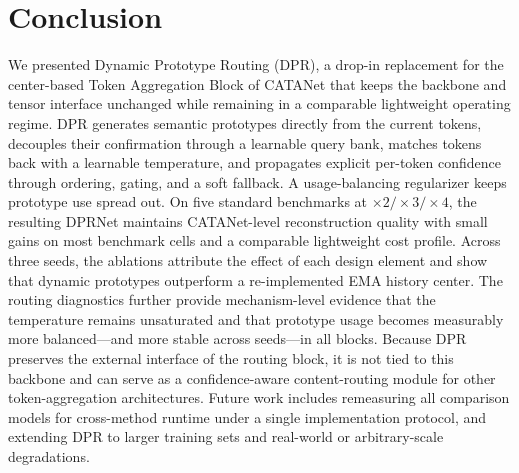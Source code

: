 \section{Conclusion}
\label{sec:conclusion}

We presented Dynamic Prototype Routing (DPR), a drop-in replacement for the
center-based Token Aggregation Block of CATANet that keeps the backbone and tensor
interface unchanged while remaining in a comparable lightweight operating regime. DPR
generates semantic prototypes directly from the current tokens, decouples their
confirmation through a learnable query bank, matches tokens back with a learnable
temperature, and propagates explicit per-token confidence through ordering, gating,
and a soft fallback. A usage-balancing regularizer keeps prototype use spread out. On
five standard benchmarks at $\times2/\times3/\times4$, the resulting DPRNet maintains
CATANet-level reconstruction quality with small gains on most benchmark cells and a
comparable lightweight cost profile. Across three seeds, the ablations attribute the
effect of each design element and show that dynamic prototypes outperform a
re-implemented EMA history center. The routing diagnostics further provide
mechanism-level evidence that the temperature remains unsaturated and that prototype
usage becomes measurably more balanced---and more stable across seeds---in all blocks.
Because DPR preserves the external interface of the routing block, it is not tied to
this backbone and can serve as a confidence-aware content-routing module for other
token-aggregation architectures. Future work includes remeasuring all comparison models
for cross-method runtime under a single implementation protocol, and extending DPR to
larger training sets and real-world or arbitrary-scale degradations.
